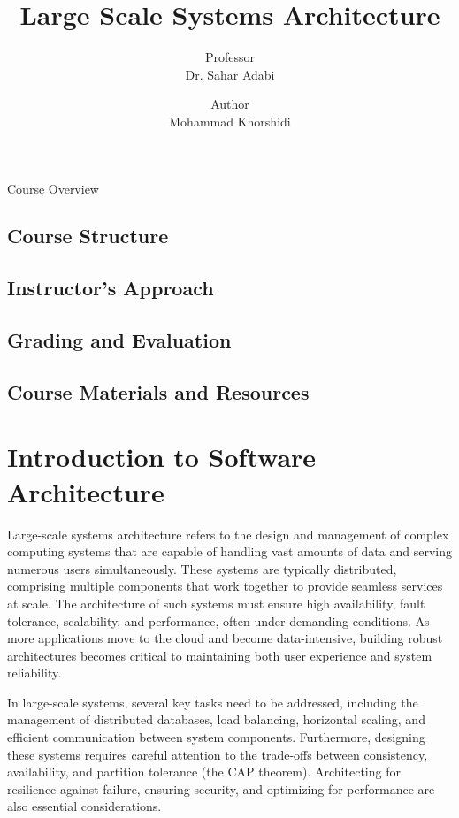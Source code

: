 \documentclass[a4paper, 10pt]{book}
\title{\huge {\bold Large Scale Systems Architecture}}
\author{Professor\\{\bold Dr. Sahar Adabi}}
\date{Author\\{\bold Mohammad Khorshidi}}
\begin{document}
    \maketitle
    \newpage

    \begin{center}
        \Large {\bold Course Overview}
    \end{center}

    \section{Course Structure}

    \section{Instructor's Approach}

    \section{Grading and Evaluation}

    \section{Course Materials and Resources}

    \tableofcontents

    \linespread{1.3}

    \chapter{{\bold Introduction to Software Architecture}}


        Large-scale systems architecture refers to the design and management of complex computing systems that are capable of handling vast amounts of data and serving numerous users simultaneously. These systems are typically distributed, comprising multiple components that work together to provide seamless services at scale. The architecture of such systems must ensure high availability, fault tolerance, scalability, and performance, often under demanding conditions. As more applications move to the cloud and become data-intensive, building robust architectures becomes critical to maintaining both user experience and system reliability.

        In large-scale systems, several key tasks need to be addressed, including the management of distributed databases, load balancing, horizontal scaling, and efficient communication between system components. Furthermore, designing these systems requires careful attention to the trade-offs between consistency, availability, and partition tolerance (the CAP theorem). Architecting for resilience against failure, ensuring security, and optimizing for performance are also essential considerations.
\end{document}
